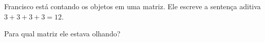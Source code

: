 \begin{question}
\begin{instance}
\begin{mcq}[standalone=false]
\begin{stem}
Francisco está contando os objetos em uma matriz. Ele escreve a sentença aditiva $3 + 3 + 3 + 3 = 12$.\par
Para qual matriz ele estava olhando?\par

\end{stem}
\begin{distractors}

\end{distractors}

\end{mcq}

\end{instance}

\end{question}
